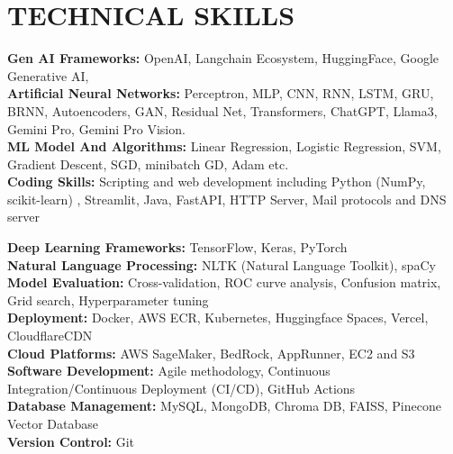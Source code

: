 \documentclass[letterpaper,11pt]{article}
\begin{document}
\section{TECHNICAL SKILLS}
\begin{itemize}[leftmargin=0.15in, label={}]
    \small{
    \item{
        
        \textbf{Gen AI Frameworks:} OpenAI, Langchain Ecosystem, HuggingFace, Google Generative AI, \\
        \vspace{0.15cm}
        \textbf{Artificial Neural Networks:} Perceptron, MLP, CNN, RNN, LSTM, GRU, BRNN, Autoencoders, GAN, Residual Net, Transformers, ChatGPT, Llama3, Gemini Pro, Gemini Pro Vision.  \\
        \vspace{0.15cm}
        \textbf{ML Model And Algorithms:} Linear Regression, Logistic Regression, SVM, Gradient Descent, SGD, minibatch GD, Adam etc. \\
        \vspace{0.15cm}
        \textbf{Coding Skills:} Scripting and web development including Python (NumPy, scikit-learn) , Streamlit, Java, FastAPI, HTTP Server, Mail protocols and DNS server \\
        \vspace{0.15cm}

        \textbf{Deep Learning Frameworks:} TensorFlow, Keras, PyTorch \\
        \vspace{0.15cm}
        \textbf{Natural Language Processing:} NLTK (Natural Language Toolkit), spaCy \\
        \vspace{0.15cm}
        \textbf{Model Evaluation:} Cross-validation, ROC curve analysis, Confusion matrix, Grid search, Hyperparameter tuning \\
        \vspace{0.15cm}
        \textbf{Deployment:} Docker, AWS ECR, Kubernetes, Huggingface Spaces, Vercel, CloudflareCDN \\
        \vspace{0.15cm}
        \textbf{Cloud Platforms:} AWS SageMaker, BedRock, AppRunner, EC2 and S3 \\
        \vspace{0.15cm}
        \textbf{Software Development:} Agile methodology, Continuous Integration/Continuous Deployment (CI/CD), GitHub Actions \\
        \vspace{0.15cm}
        \textbf{Database Management:} MySQL, MongoDB, Chroma DB, FAISS, Pinecone Vector Database \\
        \vspace{0.15cm}
        \textbf{Version Control:} Git \\
        \vspace{0.15cm}
    }
    }
\end{itemize}
\end{document}
